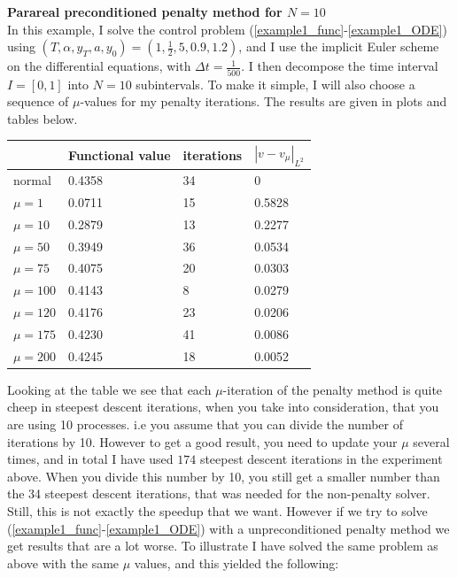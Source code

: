 \documentclass[11pt,a4paper]{article}
\begin{document}
\\
\\
\textbf{Parareal preconditioned penalty method for $N=10$}
\\
In this example, I solve the control problem (\ref{example1_func}-\ref{example1_ODE}) using $(T,\alpha,y_T,a,y_0)=(1,\frac{1}{2},5,0.9,1.2)$, and I use the implicit Euler scheme on the differential equations, with $\Delta t=\frac{1}{500}$. I then decompose the time interval $I=[0,1]$ into $N=10$ subintervals. To make it simple, I will also choose a sequence of $\mu$-values for my penalty iterations. The results are given in plots and tables below. 
 \begin{center}
    \begin{tabular}{| l | l | l | l |}
    \hline
     & Functional value &iterations  & $|v-v_{\mu}|_{L^2}$   \\ \hline
    normal &0.4358 & 34& 0 	\\ \hline
    $\mu=1$ & 0.0711& 15&0.5828 	\\ \hline
    $\mu=10$ &0.2879 &13& 0.2277	\\ \hline
    $\mu=50$ &0.3949&36& 0.0534	\\ \hline
    $\mu=75$ &0.4075&20&0.0303\\ \hline
    $\mu=100$ &0.4143&8&	0.0279\\ \hline
    $\mu=120$ &0.4176&23&0.0206\\ \hline
    $\mu=175$ &0.4230&41&0.0086\\ \hline
    $\mu=200$ &0.4245&18&0.0052\\ \hline
    \end{tabular}
\end{center}
Looking at the table we see that each $\mu$-iteration of the penalty method is quite cheep in steepest descent iterations, when you take into consideration, that you are using 10 processes. i.e you assume that you can divide the number of iterations by 10. However to get a good result, you need to update your $\mu$ several times, and in total I have used $174$ steepest descent iterations in the experiment above. When you divide this number by 10, you still get a smaller number than the 34 steepest descent iterations, that was needed for the non-penalty solver. Still, this is not exactly the speedup that we want. However if we try to solve (\ref{example1_func}-\ref{example1_ODE}) with a unpreconditioned penalty method we get results that are a lot worse. To illustrate I have solved the same problem as above with the same $\mu$ values, and this yielded the following:
\end{document}
